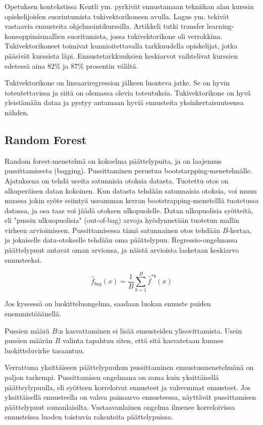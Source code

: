 \documentclass[finnish,twoside,openright]{HYgraduMLDS}
\begin{document}
Opetuksen kontekstissa Kentli ym. \cite{kentli2011svm} pyrkivät ennustamaan tekniikan alan kurssin opiskelijoiden suoriutumista tukivektorikoneen avulla. Lagus ym. \cite{lagus2018transfer} tekivät vastaavia ennusteita ohjelmointikurssilla. Artikkeli\cite{lagus2018transfer} tutki transfer learning-koneoppimismallien suoritumista, jossa tukivektorikone oli verrokkina. Tukivektorikoneet toimivat kunnioitettavalla tarkkuudella opiskelijat, jotka pääsivät kurssista läpi. Ennustetarkkuuksien keskiarvot vaihtelivat kurssien edetessä aina 82\% ja 87\% prosentin väliltä.

Tukivektorikone on lineaariregression jälkeen luonteva jatke. Se on hyvin toteutettavissa ja siitä on olemassa olevia toteutuksia. Tukivektorikone on hyvä yleistämään dataa ja pystyy antamaan hyviä ennusteita yksinkertaisuuteensa nähden.


\subsection{Random Forest}

Random forest-menetelmä on kokoelma päättelypuita, ja on laajennus pussittamisesta (bagging)\cite{james2013ISLR}. Pussittaminen perustuu bootstarpping-menetelmälle. Ajatuksena on tehdä useita satunnisia otoksia datasta. Tuotettu otos on alkuperäisen datan kokoinen. Kun datasta tehdään satunnaisia otoksia, voi muun muassa jokin syöte esiintyä useamman kerran bootstrapping-menetelllä tuotetussa datassa, ja osa taas voi jäädä otoksen ulkopuolelle. Datan ulkopuolisia syötteitä, eli "pussin ulkuopuolisia"  (out-of-bag) arvoja hyödynnetään tuotetun mallin virheen arvioimiseen. Pussittamisessa tämä satunnainen otos tehdään $B$-kertaa, ja jokaiselle data-otokselle tehdään oma päättelypuu. Regressio-ongelmassa päättelypuut antavat oman arvionsa, ja näistä arvioista lasketaan keskiarvo ennusteeksi.

\begin{equation}
    \hat{f}_{bag}(x) = \frac{1}{B} \sum^B_{b=1} \hat{f}^{*b}(x)
\end{equation}

Jos kyseessä on luokitteluongelma, saadaan luokan ennuste puiden enemmistöäänellä.\cite{james2013ISLR} 

Pussien määrä $B$:n kasvattaminen ei lisää ennusteiden ylisovittamista\cite{james2013ISLR}. Usein pussien määrän $B$ valinta tapahtuu siten, että sitä kasvatetaan kunnes luokitteluvirhe tasaantuu. 

Verrattuna yksittäiseen päättelypuuhun pussittaminen ennustusmenetelmänä on paljon tarkempi. Pussittamisen ongelmana on sama kuin yksittäisellä päätteylypuulla, eli syötteen korreloivat ennusteet ja vahvemmat ennusteet. Jos yksittäisellä ennusteella on vahva painoarvo ennusteessa, näyttävät pussittamisen päättelypuut samanlaisilta. Vastaavanlainen ongelma ilmenee korreloivissa ennusteissa luoden toistuvia rakenteita päättelypuissa.
\end{document}
